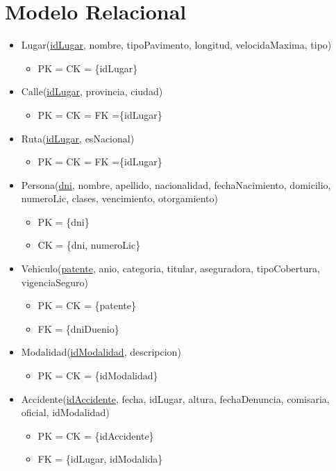 \section{Modelo Relacional}

\begin{itemize}

\item Lugar(\underline{idLugar}, nombre, tipoPavimento, longitud, velocidaMaxima, tipo)
  \begin{itemize}
  \item[] PK = CK = \{idLugar\}
  \end{itemize}


\item Calle(\underline{idLugar}, provincia, ciudad)
  \begin{itemize}
  \item[] PK = CK = FK =\{idLugar\}
  \end{itemize}


\item Ruta(\underline{idLugar}, esNacional)
  \begin{itemize}
  \item[] PK = CK = FK =\{idLugar\}
  \end{itemize}


\item Persona(\underline{dni}, nombre, apellido, nacionalidad, fechaNacimiento, domicilio, numeroLic, clases, vencimiento, otorgamiento)
  \begin{itemize}
  \item[] PK = \{dni\}
  \item[] CK = \{dni, numeroLic\}
  \end{itemize}


\item Vehiculo(\underline{patente}, anio, categoria, titular, aseguradora, tipoCobertura, vigenciaSeguro)
\begin{itemize}
  \item[] PK = CK = \{patente\}
  \item[] FK = \{dniDuenio\}
  \end{itemize}


\item Modalidad(\underline{idModalidad}, descripcion)
  \begin{itemize}
  \item[] PK = CK = \{idModalidad\}
  \end{itemize}


\item Accidente(\underline{idAccidente}, fecha, idLugar, altura, fechaDenuncia, comisaria, oficial, idModalidad)
  \begin{itemize}
  \item[] PK = CK = \{idAccidente\}
  \item[] FK = \{idLugar, idModalida\}
  \end{itemize}


\end{itemize}
